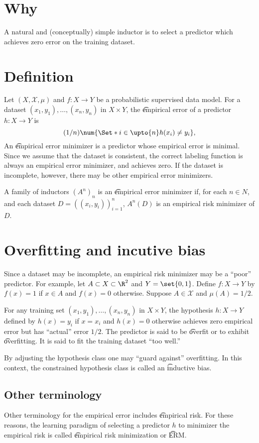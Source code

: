 
\section*{Why}

A natural and (conceptually) simple inductor is to select a predictor which achieves zero error on the training dataset.

\section*{Definition}

Let $(X, \mathcal{X} , \mu )$ and $f: X \to Y$ be a probabilistic supervised data model.
For a dataset $(x_1, y_1), \dots , (x_n, y_n)$ in $X \times Y$, the \t{empirical error} of a predictor $h: X \to Y$ is
\[
(1/n)\num{\Set*{i \in \upto{n}}{h(x_i) \neq y_i}},
\]
An \t{empirical error minimizer} is a predictor whose empirical error is minimal.
Since we assume that the dataset is consistent, the correct labeling function is always an empirical error minimizer, and achieves zero.
If the dataset is incomplete, however, there may be other empirical error minimizers.

A family of inductors $(A^n)_n$ is an \t{empirical error minimizer} if, for each $n \in N$, and each dataset $D = ((x_i, y_i))_{i = 1}^{n}$, $A^n(D)$ is an empirical risk minimizer of $D$.

\section*{Overfitting and incutive bias}

Since a dataset may be incomplete, an empirical risk minimizer may be a ``poor'' predictor.
For example, let $A \subset X \subset \R ^2$ and $Y = \set{0, 1}$.
Define $f: X \to Y$ by $f(x) = 1$ if $x \in A$ and $f(x) = 0$ otherwise.
Suppose $A \in \mathcal{X} $ and $\mu (A) = 1/2$.

For any training set $(x_1, y_1), \dots , (x_n, y_n)$ in $X \times Y$, the hypothesis $h: X \to Y$ defined by $h(x) = y_i$ if $x = x_i$ and $h(x) = 0$ otherwise achieves zero empirical error but has ``actual'' error $1/2$.
The predictor is said to be \t{overfit} or to exhibit \t{overfitting}.
It is said to fit the training dataset ``too well.''

By adjusting the hypothesis class one may ``guard against'' overfitting.
In this context, the constrained hypothesis class is called an \t{inductive bias}.

\subsection*{Other terminology}

Other terminology for the empirical error includes \t{empirical risk}.
For these reasons, the learning paradigm of selecting a predictor $h$ to minimizer the empirical risk is called \t{empirical risk minimization} or \t{ERM}.
